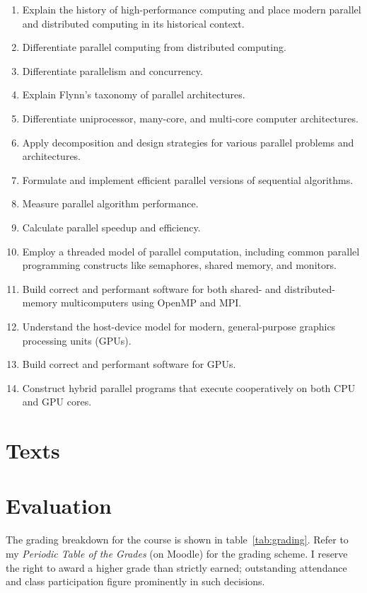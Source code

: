 \documentclass[11pt]{article}
\begin{document}
\begin{enumerate}
\item Explain the history of high-performance computing
  and place modern parallel and distributed computing
  in its historical context.
\item Differentiate parallel computing
  from distributed computing.
\item Differentiate parallelism and concurrency.
\item Explain Flynn's taxonomy of parallel architectures.
\item Differentiate uniprocessor, many-core, and multi-core computer architectures.
\item Apply decomposition and design strategies
  for various parallel problems and architectures.
\item Formulate and implement efficient parallel versions of sequential algorithms.
\item Measure parallel algorithm performance.
\item Calculate parallel speedup and efficiency.
\item Employ a threaded model of parallel computation,
  including common parallel programming constructs
  like semaphores, shared memory, and monitors.
\item Build correct and performant software
  for both shared- and distributed-memory multicomputers
  using OpenMP and MPI.
\item Understand the host-device model
  for modern, general-purpose graphics processing units (GPUs).
\item Build correct and performant software for GPUs.
\item Construct hybrid parallel programs
  that execute cooperatively on both CPU and GPU cores.
\end{enumerate}

\section{Texts}



\section{Evaluation}

The grading breakdown
for the course
is shown in table~\ref{tab:grading}.
Refer to my \emph{Periodic Table of the Grades} (on Moodle) for the grading scheme. I reserve
the right to award a higher grade than strictly earned; outstanding attendance and class
participation figure prominently in such decisions.
\end{document}
